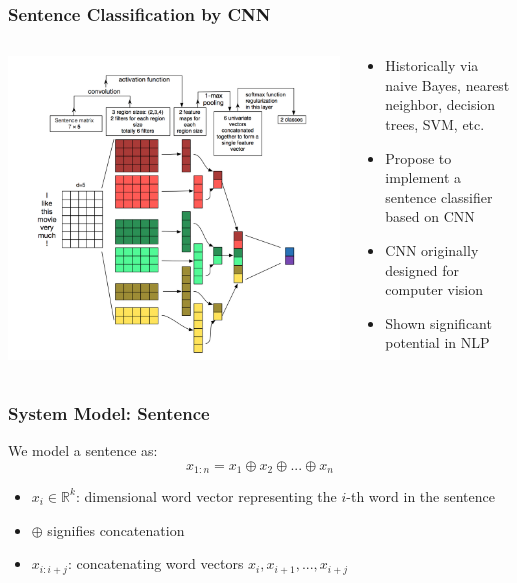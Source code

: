 \documentclass{beamer}
\begin{document}
\begin{frame}
\frametitle{Sentence Classification by CNN}
        \begin{columns}
    \begin{column}{0.5\textwidth}
    \center\includegraphics[width=\textwidth]{figure/sc_cnn}
    \end{column}
    \begin{column}{0.5\textwidth}
    \begin{itemize}
        \item Historically via naive Bayes, nearest neighbor, decision trees, SVM, etc.
        \item Propose to implement a sentence classifier based on CNN
        \item CNN originally designed for computer vision
        \item Shown significant potential in NLP
    \end{itemize}
    \end{column}
    \end{columns}
\end{frame}

\begin{frame}
\frametitle{System Model: Sentence}
    We model a sentence as:
    $$x_{1:n} = x_1 \oplus x_2 \oplus ... \oplus x_n$$
    \begin{itemize}
        \item $x_{i} \in \mathbb{R}^k$: dimensional word vector representing the $i$-th word in the sentence
        \item $\oplus$ signifies concatenation
        \item $x_{i:i+j}$: concatenating word vectors $x_i, x_{i+1}, ... , x_{i+j}$
    \end{itemize}
\end{frame}
\end{document}
